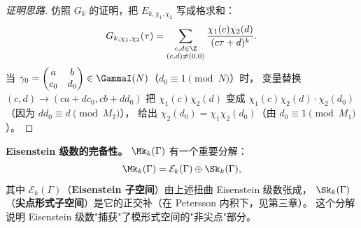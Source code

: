 \begin{proof}[证明思路]
仿照 $G_k$ 的证明，把 $E_{k,\chi_1,\chi_2}$ 写成格求和：
\[
  G_{k,\chi_1,\chi_2}(\tau)
  = \sum_{\substack{c,d \in \Z \\ (c,d) \neq (0,0)}}
    \frac{\chi_1(c)\chi_2(d)}{(c\tau + d)^k}.
\]
当 $\gamma_0 = \begin{pmatrix} a & b \\ c_0 & d_0 \end{pmatrix} \in \GammaI(N)$（$d_0 \equiv 1 \pmod N$）时，
变量替换 $(c,d) \to (ca + dc_0, cb + dd_0)$ 把 $\chi_1(c)\chi_2(d)$ 变成
$\chi_1(c)\chi_2(d) \cdot \chi_2(d_0)$（因为 $dd_0 \equiv d \pmod{M_2}$），
给出 $\chi_2(d_0) = \chi_1\chi_2(d_0)$（由 $d_0 \equiv 1 \pmod{M_1}$）。
\end{proof}

\textbf{Eisenstein 级数的完备性。}
$\Mk_k(\Gamma)$ 有一个重要分解：
\[
  \Mk_k(\Gamma) = \mathcal{E}_k(\Gamma) \oplus \Sk_k(\Gamma),
\]
其中 $\mathcal{E}_k(\Gamma)$（\textbf{Eisenstein 子空间}）由上述扭曲 Eisenstein 级数张成，
$\Sk_k(\Gamma)$（\textbf{尖点形式子空间}）是它的正交补（在 Petersson 内积下，见第三章）。
这个分解说明 Eisenstein 级数"捕获"了模形式空间的"非尖点"部分。


